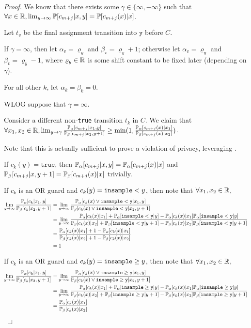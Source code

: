 \begin{proof}
	We know that there exists some $\gamma \in \{\infty, -\infty\}$ such that $\forall x\in\RR, \lim_{y\to\infty}\PP[c_{m+j}|x, y]=\PP[c_{m+j}(x)|x]$. 

	Let $t_v$ be the final assignment transition into $\texttt{y}$ before $C$. 

	If $\gamma = \infty$, then let $\alpha_v = \varrho_y$ and $\beta_v = \varrho_y+1$; otherwise let $\alpha_v = \varrho_y$ and $\beta_v = \varrho_y-1$, where $\varrho_y\in \RR$ is some shift constant to be fixed later (depending on $\gamma$).

	For all other $k$, let $\alpha_k=\beta_k=0$. 

	WLOG suppose that $\gamma = \infty$. 

	Consider a different non-\texttt{true} transition $t_k$ in $C$. We claim that $\forall x_1, x_2\in \RR, \lim_{y\to\gamma}\frac{\PP_\alpha[c_{m+j}|x_1, y]}{\PP_\beta[c_{m+j}|x_2, y+1]}\geq \min(1, \frac{\PP_\alpha[c_{m+j}(x)|x_1]}{\PP_\beta[c_{m+j}(x)|x_2]})$. 

	Note that this is actually sufficient to prove a violation of privacy, leveraging \cite{chadhaLinearTimeDecidability2021}. 

	If $c_k(y) = \texttt{true}$, then $\PP_\alpha[c_{m+j}|x, y]=\PP_\alpha[c_{m+j}(x)|x]$ and $\PP_\beta[c_{m+j}|x, y+1]=\PP_\beta[c_{m+j}(x)|x]$ trivially. 

	If $c_k$ is an OR guard and $c_k(y) = \lguard[y]$, then note that $\forall x_1, x_2\in \RR$, \begin{align*}
		\lim_{y\to\infty}\frac{\PP_\alpha[c_k|x_1, y]}{\PP_\beta[c_k|x_2, y+1]}&=\lim_{y\to\infty}\frac{\PP_\alpha[c_k(x)\lor \lguard[\texttt{y}]|x_1, y]}{\PP_\beta[c_k(x)\lor \lguard[\texttt{y}]|x_2, y+1]}\\
		&=\lim_{y\to\infty}\frac{\PP_\alpha[c_k(x)|x_1]+ \PP_\alpha[\lguard[\texttt{y}]|y]-\PP_\alpha[c_k(x)|x_1]\PP_\alpha[\lguard[\texttt{y}]|y]}{\PP_\beta[c_k(x)|x_2]+ \PP_\beta[\lguard[\texttt{y}]|y+1]-\PP_\beta[c_k(x)|x_2]\PP_\beta[\lguard[\texttt{y}]|y+1]}\\
		&=\frac{\PP_\alpha[c_k(x)|x_1]+ 1-\PP_\alpha[c_k(x)|x_1]}{\PP_\beta[c_k(x)|x_2]+ 1-\PP_\beta[c_k(x)|x_2]}\\
		&= 1
	\end{align*}

	If $c_k$ is an OR guard and $c_k(y) = \gguard[y]$, then note that 
	$\forall x_1, x_2\in \RR$, \begin{align*}
		\lim_{y\to\infty}\frac{\PP_\alpha[c_k|x_1, y]}{\PP_\beta[c_k|x_2, y+1]}&=\lim_{y\to\infty}\frac{\PP_\alpha[c_k(x)\lor \gguard[\texttt{y}]|x_1, y]}{\PP_\beta[c_k(x)\lor \gguard[\texttt{y}]|x_2, y+1]}\\
		&=\lim_{y\to\infty}\frac{\PP_\alpha[c_k(x)|x_1]+ \PP_\alpha[\gguard[\texttt{y}]|y]-\PP_\alpha[c_k(x)|x_1]\PP_\alpha[\gguard[\texttt{y}]|y]}{\PP_\beta[c_k(x)|x_2]+ \PP_\beta[\gguard[\texttt{y}]|y+1]-\PP_\beta[c_k(x)|x_2]\PP_\beta[\gguard[\texttt{y}]|y+1]}\\
		&=\frac{\PP_\alpha[c_k(x)|x_1]}{\PP_\beta[c_k(x)|x_2]}
	\end{align*}


\end{proof}
